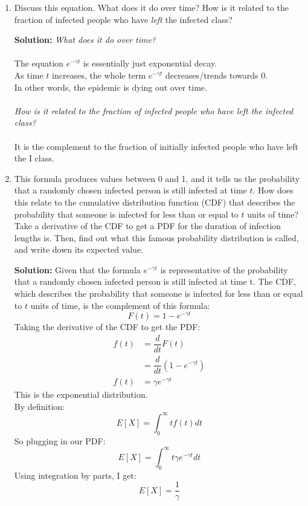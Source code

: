 \documentclass[11pt]{article}
\newenvironment{solution}{\par\noindent\begingroup\color{BrickRed}\textbf{Solution:} }{\par\endgroup}
\begin{document}
\begin{enumerate}
\begin{enumerate}[label=\alph*.]
	\item Discuss this equation. 
		  What does it do over time?
		  How is it related to the fraction of infected people who have {\it left} the infected class?
		\begin{solution} \newline \newline
			\textit{What does it do over time?} \\ \\
				The equation $e^{-\gamma t}$ is essentially just exponential decay. \\
				As time $t$ increases, the whole term $e^{-\gamma t}$ decreases/trends towards $0$. \\
				In other words, the epidemic is dying out over time. \\ \\
			\textit{How is it related to the fraction of infected people who have left the infected class?} \\ \\
				It is the complement to the fraction of initially infected people who have left the I class.
		\end{solution}
			
	\item This formula produces values between 0 and 1,
		  and it tells us the probability that a randomly chosen infected person is still infected at time $t$.
		  How does this relate to the cumulative distribution function (CDF) 
		  that describes the probability that someone is infected for less than or equal to $t$ units of time? 
		  Take a derivative of the CDF to get a PDF for the duration of infection lengths is. 
		  Then, find out what this famous probability distribution is called, and write down its expected value.
		\begin{solution} \newline \newline
			Given that the formula $e^{-\gamma t}$ is representative of the probability that a randomly chosen infected person is still infected at time t.
			The CDF, which describes the probability that someone is infected for less than or equal to $t$ units of time, is the complement of this formula:
			$$F(t) = 1 - e^{-\gamma t}$$
			Taking the derivative of the CDF to get the PDF:
			\begin{align*}
			f(t) &= \dfrac{d}{dt} F(t) \\
				 &= \dfrac{d}{dt} (1 - e^{-\gamma t}) \\
			f(t) &= \gamma e^{-\gamma t}
			\end{align*}
			This is the exponential distribution. \\
			By definition:
			$$E[X] = \int_0^\infty t f(t) dt$$
			So plugging in our PDF:
			$$E[X] = \int_0^\infty t \gamma e^{-\gamma t} dt$$
			Using integration by parts, I get:
			$$E[X] = \frac{1}{\gamma}$$
		\end{solution}


\end{enumerate}
\end{enumerate}
\end{document}
